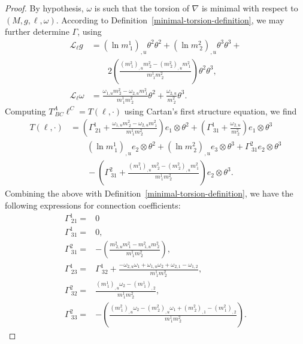 \documentclass[10pt,a4paper]{amsart}
\newcommand{\ai}{A}
\newcommand{\bb}{B}
\newcommand{\cc}{C}
\begin{document}
\begin{proof}
    By hypothesis, $\omega$ is such that the torsion of $\nabla$ is minimal with respect to $(M,g,\ell,\omega)$. According to Definition~\ref{minimal-torsion-definition}, we may further determine $\Gamma$, using
    \begin{equation} \label{lie-derivs}
    \begin{aligned}
        \mathcal{L}_{\ell}g &= (\ln m^1_{~1})_{,u} \theta^2 \theta^2 + (\ln m^2_{~2})_{,u} \theta^3 \theta^3 + \\
        &\quad \quad 2 \left(\frac{(m^2_{~1})_{,u} m^2_{~2} - (m^2_{~2})_{,u} m^2_{~1}}{m^1_{~1} m^2_{~2}} \right) \theta^2 \theta^3, \\
        \mathcal{L}_\ell \omega &= \frac{\omega_{1,u} m^2_{~2} - \omega_{2,u} m^2_{~1}}{m^1_{~1} m^2_{~2}} \theta^2 + \frac{\omega_{2,u}}{m^2_{~2}} \theta^3.
    \end{aligned}
    \end{equation}
    Computing $T^\ai_{~\bb \cc}\ell^\cc = T(\ell, \cdot)$ using Cartan's first structure equation, we find
    \begin{equation}
    \begin{aligned}
        T(\ell,\cdot) &= \left( \Gamma^1_ {~21} + \frac{ \omega_{1,u} m^2_{~2}-\omega_{2,u}m^2_{~1}}{m^1_{~1} m^2_{~2}} \right) e_1 \otimes \theta^2 + \left(  \Gamma^1_ {~31} +\frac{\omega_{2,u}}{m^2_{~2}} \right) e_1 \otimes \theta^3 \\
        &\quad \quad  (\ln m^1_{~1})_{,u} e_2 \otimes \theta^2 + (\ln m^2_{~2})_{,u} e_3 \otimes \theta^3 + \Gamma^2_{~31} e_2 \otimes \theta^3 \\
        &\quad \quad -\left( \Gamma^2_{~31} +\frac{(m^2_{~1})_{,u} m^2_{~2} - (m^2_{~2})_{,u} m^2_{~1}}{m^1_{~1} m^2_{~2}} \right) e_2 \otimes \theta^3.
    \end{aligned}
    \end{equation}
    Combining the above with Definition~\ref{minimal-torsion-definition},
    we have the following expressions for connection coefficients: 
    \begin{equation}
    \begin{aligned}
        \Gamma^1_{~21} =& 0 \\ 
        \Gamma^1_{~31} =& 0, \\
         \Gamma^2_ {~31} =& -\left(\frac{m^2_{~2,u} m^2_{~1}- m^2_{~1,u} m^2_{~2} }{m^1_{~1} m^2_{~2}}\right), \\
         \Gamma^1_{~23} =& \Gamma^1_{~32} + \frac{ -\omega_{2,u} \omega_1 + \omega_{1,u} \omega_2  + \omega_{2,1}-\omega_{1,2}}{m^1_{~1} m^2_{~2}}, \\
         \Gamma^2_{~32} = & \frac{(m^1_{~1})_{,u} \omega_2 - (m^1_{~1})_{,2}}{m^1_{~1} m^2_{~2}}, \\
       \Gamma^2_{~33} = & - \left(\frac{(m^2_{~1})_{,u} \omega_2 - (m^2_{~2})_{,u} \omega_1 + (m^2_{~2})_{,1}-(m^2_{~1})_{,2}}{m^1_{~1} m^2_{~2}} \right).
    \end{aligned} \label{eqn:Thm32c}
    \end{equation}
    

\end{proof}
\end{document}
